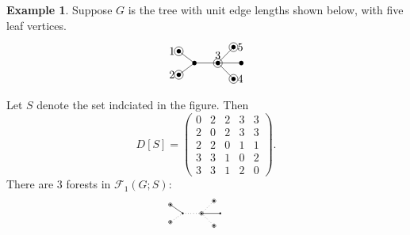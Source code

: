 \documentclass[12pt]{amsart}
\theoremstyle{definition}
\newtheorem{eg}[thm]{Example}
\newcommand{\forests}{\mathcal{F}}
\begin{document}


\begin{eg}
Suppose $G$ is the tree with unit edge lengths shown below, with five leaf vertices.
\[
\begin{tikzpicture}[scale=1.0]
	\coordinate (1) at (-1,0.37);
	\coordinate (2) at (-1,-0.37);
	\coordinate (4) at (0.75,-0.5);
	\coordinate (B) at (1,0);
	\coordinate (5) at (0.75,0.5);
	\coordinate (A) at (-0.5,0);
	\coordinate (3) at (0.25,0);
	
	\foreach \c in {1,2,3,4,5,A,B} {
		\fill (\c) circle (2pt);
	}
	\foreach \c in {1,2,3,4,5} {
		\draw (\c) circle (4pt);
	}

	\draw (A) -- (1);
	\draw (A) -- (2);
	\draw (3) -- (4);
	\draw (3) -- (B);
	\draw (3) -- (5);
	\draw (A) -- (3);
	
	\foreach \c/\d in {1/left,2/left,3/above,4/right,5/right} {
		\node[\d=0.2] at (\c) {$\c$};
	}
\end{tikzpicture}
\]
Let $S$ denote the set indciated in the figure. Then
\[
	D[S] = \begin{pmatrix}
	0 & 2 & 2 & 3 & 3 \\
	2 & 0 & 2 & 3 & 3 \\
	2 & 2 & 0 & 1 & 1 \\
	3 & 3 & 1 & 0 & 2 \\
	3 & 3 & 1 & 2 & 0
	\end{pmatrix}.
\]
There are $3$ forests in $\forests_1(G; S)$:
\[
\begin{tikzpicture}[scale=0.4]
	\coordinate (1) at (-2,0.7);
	\coordinate (2) at (-2,-0.7);
	\coordinate (3) at (1.5,-1);
	\coordinate (4) at (2,0);
	\coordinate (5) at (1.5,1);
	\coordinate (A) at (-1,0);
	\coordinate (B) at (0.5,0);
	
	\foreach \c in {1,2,3,4,5,A,B} {
		\fill (\c) circle (2pt);
	}
	\foreach \c in {1,2,3,B,5} {
		\draw (\c) circle (4pt);
	}

	\draw (A) -- (1);
	\draw[dotted] (A) -- (2);
	\draw[dotted] (B) -- (3);
	\draw (B) -- (4);
	\draw[dotted] (B) -- (5);
	\draw[dotted] (A) -- (B);
\end{tikzpicture}
\qquad
\begin{tikzpicture}[scale=0.4]
	\coordinate (1) at (-2,0.7);
	\coordinate (2) at (-2,-0.7);
	\coordinate (3) at (1.5,-1);
	\coordinate (4) at (2,0);
	\coordinate (5) at (1.5,1);
	\coordinate (A) at (-1,0);
	\coordinate (B) at (0.5,0);
	

\end{tikzpicture}\]
\end{eg}
\end{document}
